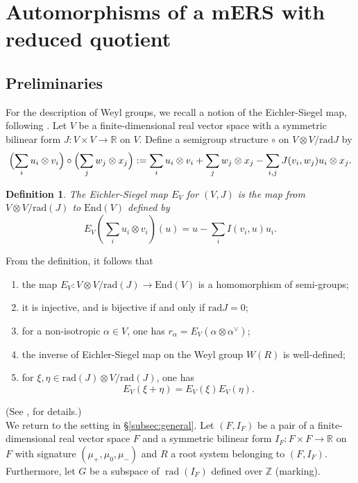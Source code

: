 \documentclass[11pt]{amsart}
\newcommand{\R}{\mathbb{R}}
\newcommand{\Z}{\mathbb{Z}}
\newcommand{\End}{\mathrm{End}}
\newtheorem{defn}{Definition}[section]
\newcommand{\rad}{\operatorname{rad}}
\begin{document}
{%
\section{Automorphisms of a mERS with reduced quotient}\label{sect:auto-mers-reduced-case}
\subsection{Preliminaries}
For the description of Weyl groups, we recall a notion of 
the Eichler-Siegel map, following \cite{Saito1985}.
Let $V$ be a finite-dimensional real vector space with a symmetric 
bilinear form $J:V\times V\to \R$ on $V$.  Define a semigroup structure 
$\circ$ on $V\otimes V/\mbox{rad}J$ by
\begin{equation*}
\Bigl(\sum_i u_i\otimes v_i\Bigr)\circ \Bigl(\sum_j w_j\otimes x_j\Bigr):=
\sum_i u_i\otimes v_i+\sum_j w_j\otimes x_j-\sum_{i,j}J(v_i,w_j)u_i\otimes x_j.
\end{equation*}
\begin{defn} The Eichler-Siegel map $E_V$ for $(V,J)$ is the map from 
$V\otimes V/\mathrm{rad}(J)$ to $\End(V)$ defined by
\[ E_V(\sum_i u_i \otimes v_i)(u)=u-\sum_i  I(v_i,u)u_i. \]
\end{defn}
From the definition, it follows that
\begin{enumerate}
\item[i)] the map $E_V:V \otimes V/\mathrm{rad}(J) \rightarrow \End(V)$ is
a homomorphism of semi-groups;
\item[ii)] it is injective, and is bijective if and only if $\mathrm{rad}{J}=0$;
\item[iii)] for a non-isotropic $\alpha \in V$, one has $r_\alpha=E_V(\alpha \otimes 
\alpha^\vee)$;
\item[iv)] the inverse of Eichler-Siegel map on the Weyl group $W(R)$ is well-defined;
\item[v)] for $\xi, \eta \in \mathrm{rad}(J) \otimes V/\mathrm{rad}(J)$, one has
\[E_V(\xi+\eta)=E_V(\xi)E_V(\eta). \]
\end{enumerate}
(See \cite{Saito1985}, for details.) \\

We return to the setting in \S \ref{subsec:general}.  Let $(F,I_F)$ be a pair of 
a finite-dimensional real vector space $F$ and a symmetric bilinear form 
$I_F:F\times F\to \R$ on $F$ with signature $(\mu_+,\mu_0,\mu_-)$ and 
$R$ a root system belonging to $(F,I_F)$. Furthermore, let $G$ be a subspace of 
$\rad (I_F)$ defined over $\Z$ (marking). 

}
\end{document}
